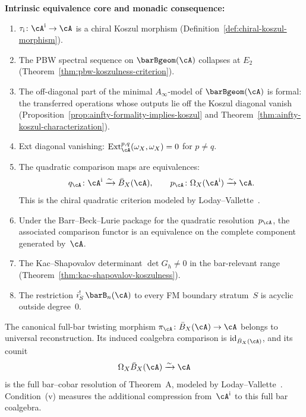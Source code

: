 \begin{theorem}
\smallskip
\noindent\textbf{Intrinsic equivalence core and monadic consequence:}
\begin{enumerate}
\item[\textup{(i)}] $\tau_{\mathrm i}\colon\cA^{\mathrm i}\to\cA$ is a
 chiral Koszul morphism
 \textup{(}Definition~\textup{\ref{def:chiral-koszul-morphism})}.
\item[\textup{(ii)}] The PBW spectral sequence on
 $\barBgeom(\cA)$ collapses at $E_2$
 \textup{(}Theorem~\textup{\ref{thm:pbw-koszulness-criterion})}.
\item[\textup{(iii)}] The off-diagonal part of the minimal
 $A_\infty$-model of $\barBgeom(\cA)$ is formal: the transferred
 operations whose outputs lie off the Koszul diagonal vanish
 \textup{(}Proposition~\textup{\ref{prop:ainfty-formality-implies-koszul}}
 and Theorem~\textup{\ref{thm:ainfty-koszul-characterization})}.
\item[\textup{(iv)}] Ext diagonal vanishing:
 $\operatorname{Ext}^{p,q}_\cA(\omega_X, \omega_X) = 0$ for
 $p \neq q$.
\item[\textup{(v)}] The quadratic comparison maps are equivalences:
 \[
 q_\cA\colon\cA^{\mathrm i}\xrightarrow{\sim}\bar B_X(\cA),
 \qquad
 p_\cA\colon\Omega_X(\cA^{\mathrm i})
 \xrightarrow{\sim}\cA.
 \]
 This is the chiral quadratic criterion modeled by
 Loday--Vallette~\cite[Theorem~3.4.6]{LV12}.
\item[\textup{(vi)}] Under the Barr--Beck--Lurie package for the
 quadratic resolution~$p_\cA$, the associated comparison functor is
 an equivalence on the complete component generated by~$\cA$.
\item[\textup{(ix)}] The Kac--Shapovalov determinant
 $\det G_h \neq 0$ in the bar-relevant range
 \textup{(}Theorem~\textup{\ref{thm:kac-shapovalov-koszulness})}.
\item[\textup{(x)}] The restriction
 $i_S^!\,\barB_n(\cA)$ to every FM boundary stratum~$S$ is
 acyclic outside degree~$0$.
\end{enumerate}

The canonical full-bar twisting morphism
$\pi_\cA\colon\bar B_X(\cA)\to\cA$ belongs to universal
reconstruction.  Its induced coalgebra comparison is
$\mathrm{id}_{\bar B_X(\cA)}$, and its counit
\[
 \Omega_X\bar B_X(\cA)\xrightarrow{\sim}\cA
\]
is the full bar--cobar resolution of Theorem~A, modeled by
Loday--Vallette~\cite[Corollary~2.3.4]{LV12}.  Condition~\textup{(v)}
measures the additional compression from~$\cA^{\mathrm i}$ to this
full bar coalgebra.


\end{theorem}
